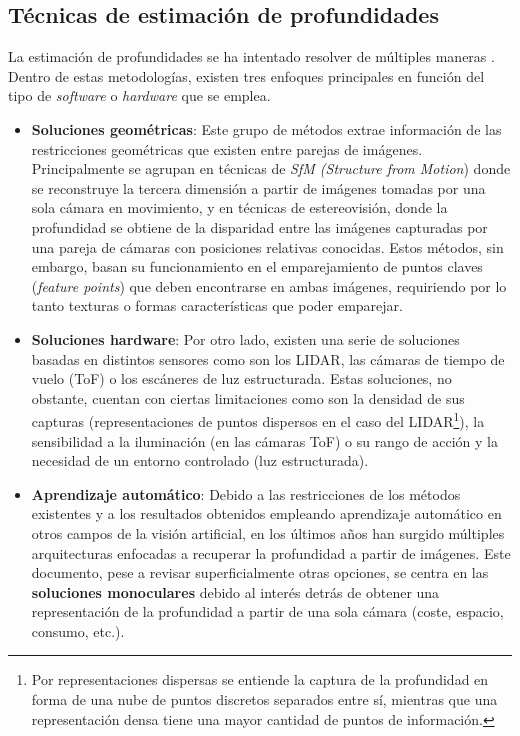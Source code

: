 \subsection{Técnicas de estimación de profundidades} \label{estimacion-profundidades-sota}

La estimación de profundidades se ha intentado resolver de múltiples maneras \cite{Zhao_2020}. Dentro de estas metodologías, existen tres enfoques principales en función del tipo de \textit{software} o \textit{hardware} que se emplea.
\begin{itemize}
    \item \textbf{Soluciones geométricas}: Este grupo de métodos extrae información de las restricciones geométricas que existen entre parejas de imágenes. Principalmente se agrupan en técnicas de \textit{SfM (Structure from Motion}) donde se reconstruye la tercera dimensión a partir de imágenes tomadas por una sola cámara en movimiento, y en técnicas de estereovisión, donde la profundidad se obtiene de la disparidad entre las imágenes capturadas por una pareja de cámaras con posiciones relativas conocidas. Estos métodos, sin embargo, basan su funcionamiento en el emparejamiento de puntos claves (\textit{feature points}) que deben encontrarse en ambas imágenes, requiriendo por lo tanto texturas o formas características que poder emparejar.
    \item \textbf{Soluciones hardware}: Por otro lado, existen una serie de soluciones basadas en distintos sensores como son los LIDAR, las cámaras de tiempo de vuelo (ToF) o los escáneres de luz estructurada. Estas soluciones, no obstante, cuentan con ciertas limitaciones como son la densidad de sus capturas (representaciones de puntos dispersos en el caso del LIDAR\footnote{Por representaciones dispersas se entiende la captura de la profundidad en forma de una nube de puntos discretos separados entre sí, mientras que una representación densa tiene una mayor cantidad de puntos de información.}), la sensibilidad a la iluminación (en las cámaras ToF) o su rango de acción y la necesidad de un entorno controlado (luz estructurada).
    \item \textbf{Aprendizaje automático}: Debido a las restricciones de los métodos existentes y a los resultados obtenidos empleando aprendizaje automático en otros campos de la visión artificial, en los últimos años han surgido múltiples arquitecturas enfocadas a recuperar la profundidad a partir de imágenes. Este documento, pese a revisar superficialmente otras opciones, se centra en las \textbf{soluciones monoculares} debido al interés detrás de obtener una representación de la profundidad a partir de una sola cámara (coste, espacio, consumo, etc.).
\end{itemize}

